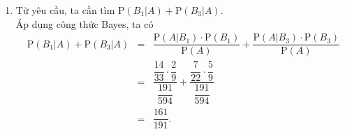 \begin{bt}
{\begin{enumerate}
\begin{eqnarray*}
				&=& \dfrac{191}{594}.
			\end{eqnarray*}
			\item Từ yêu cầu, ta cần tìm $\mathrm{P}(B_1|A) + \mathrm{P}(B_3|A)$.\\
			Áp dụng công thức Bayes, ta có
			\allowdisplaybreaks
			\begin{eqnarray*}
				\mathrm{P}(B_1|A) + \mathrm{P}(B_3|A) 
				&=& \dfrac{\mathrm{P}(A|B_1)\cdot \mathrm{P}(B_1)}{\mathrm{P}(A)} + \dfrac{\mathrm{P}(A|B_3)\cdot \mathrm{P}(B_3)}{\mathrm{P}(A)}\\
				&=& \dfrac{\dfrac{14}{33}\cdot \dfrac{2}{9}}{\dfrac{191}{594}} + \dfrac{\dfrac{7}{22}\cdot \dfrac{5}{9}}{\dfrac{191}{594}}\\
				&=& \dfrac{161}{191}.
			\end{eqnarray*}
		\end{enumerate}
	}
\end{bt}


